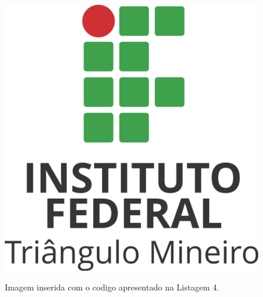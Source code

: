 \documentclass[a4paper]{article}
\begin{document}
\begin{figure}[h]
	\centering %
	\includegraphics[scale=0.4]{imagens/iftm.png}\\%
	\caption{Imagem inserida com o codigo apresentado na Listagem 4.}
\end{figure}
\end{document}
